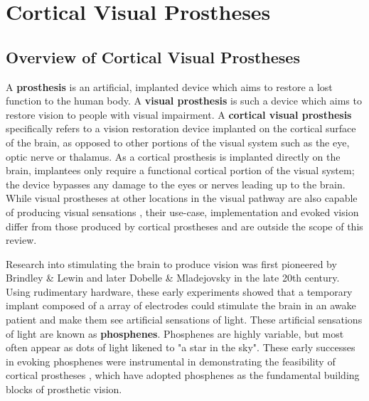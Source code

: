 \documentclass[a4paper,11pt,openany]{book}
\begin{document}
\clearpage

\chapter{Cortical Visual Prostheses}
\label{sec:orgf17615c}
\label{org4a09feb}

\section*{Overview of Cortical Visual Prostheses}
\label{sec:org77b9fd2}

A \textbf{prosthesis} is an artificial, implanted device which aims to restore a lost function to the human body. \cite{thurston_pare_2007}
A \textbf{visual prosthesis} is such a device which aims to restore vision to people with visual impairment. \cite{weiland_visual_2008,ong_bionic_2012}
A \textbf{cortical visual prosthesis} specifically refers to a vision restoration device implanted on the cortical surface of the brain, as opposed to other portions of the visual system such as the eye, optic nerve or thalamus. \cite{lewis_restoration_2015}
As a cortical prosthesis is implanted directly on the brain, implantees only require a functional cortical portion of the visual system; the device bypasses any damage to the eyes or nerves leading up to the brain.
While visual prostheses at other locations in the visual pathway are also capable of producing visual sensations \cite{humayun_visual_1996,stingl_interim_2017,veraart_visual_1998,panetsos_consistent_2011}, their use-case, implementation and evoked vision differ from those produced by cortical prostheses and are outside the scope of this review.

Research into stimulating the brain to produce vision was first pioneered by Brindley \& Lewin \cite{brindley_sensations_1968} and later Dobelle \& Mladejovsky \cite{dobelle_phosphenes_1974} in the late 20th century.
Using rudimentary hardware, these early experiments showed that a temporary implant composed of a array of electrodes could stimulate the brain in an awake patient and make them see artificial sensations of light. \cite{brindley_sensations_1968,dobelle_phosphenes_1974}
These artificial sensations of light are known as \textbf{phosphenes}.
Phosphenes are highly variable, but most often appear as dots of light likened to "a star in the sky". \cite{dobelle_phosphenes_1974}
These early successes in evoking phosphenes were instrumental in demonstrating the feasibility of cortical prostheses \cite{schmidt_feasibility_1996}, which have adopted phosphenes as the fundamental building blocks of prosthetic vision.
\end{document}
